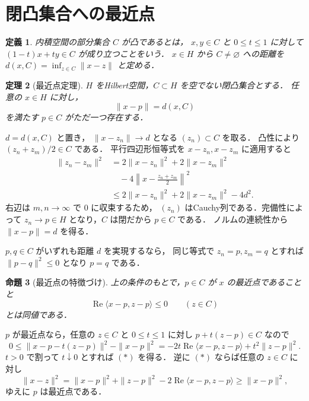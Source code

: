\documentclass[a5paper,10pt,onecolumn]{jsarticle}
\makeatletter
\theoremstyle{mathnotetheorem}
\newtheorem{theorem}{定理}[section]
\newtheorem{definition}[theorem]{定義}
\newtheorem{proposition}[theorem]{命題}
\renewcommand{\proofname}{証明}
\renewenvironment{proof}[1][\proofname]{%
  \par\pushQED{\qed}\normalfont\topsep4\p@\@plus2\p@\relax
  \trivlist\item[\hskip\labelsep\bfseries #1]\ignorespaces
}{\popQED\endtrivlist\@endpefalse}
\makeatother
\begin{document}
\section{閉凸集合への最近点}

\begin{definition}
内積空間の部分集合 $C$ が凸であるとは，
$x,y\in C$ と $0\le t\le1$ に対して
$(1-t)x+ty\in C$ が成り立つことをいう．
$x\in H$ から $C\ne\varnothing$ への距離を
$d(x,C)=\inf_{z\in C}\|x-z\|$ と定める．
\end{definition}

\begin{theorem}[最近点定理]\label{thm:nearest}
$H$ をHilbert空間，$C\subset H$ を空でない閉凸集合とする．
任意の $x\in H$ に対し，
\[
 \|x-p\|=d(x,C)
\]
を満たす $p\in C$ がただ一つ存在する．
\end{theorem}
\begin{proof}
$d=d(x,C)$ と置き，
$\|x-z_n\|\to d$ となる $(z_n)\subset C$ を取る．
凸性により $(z_n+z_m)/2\in C$ である．
平行四辺形恒等式を $x-z_n,x-z_m$ に適用すると
\begin{align*}
 \|z_n-z_m\|^2
 &=2\|x-z_n\|^2+2\|x-z_m\|^2\\
 &\quad-4\left\|x-\frac{z_n+z_m}{2}\right\|^2\\
 &\le 2\|x-z_n\|^2+2\|x-z_m\|^2-4d^2.
\end{align*}
右辺は $m,n\to\infty$ で $0$ に収束するため，
$(z_n)$ はCauchy列である．完備性によって
$z_n\to p\in H$ となり，$C$ は閉だから $p\in C$ である．
ノルムの連続性から $\|x-p\|=d$ を得る．

$p,q\in C$ がいずれも距離 $d$ を実現するなら，
同じ等式で $z_n=p,z_m=q$ とすれば
$\|p-q\|^2\le0$ となり $p=q$ である．
\end{proof}

\begin{proposition}[最近点の特徴づけ]\label{prop:variational}
上の条件のもとで，$p\in C$ が $x$ の最近点であることと
\[
 \operatorname{Re}\langle x-p,z-p\rangle\le0
 \qquad(z\in C)                                     \tag{$*$}
\]
とは同値である．
\end{proposition}
\begin{proof}
$p$ が最近点なら，任意の $z\in C$ と $0\le t\le1$ に対し
$p+t(z-p)\in C$ なので
\[
0\le\|x-p-t(z-p)\|^2-\|x-p\|^2
=-2t\operatorname{Re}\langle x-p,z-p\rangle
  +t^2\|z-p\|^2.
\]
$t>0$ で割って $t\downarrow0$ とすれば $(*)$ を得る．
逆に $(*)$ ならば任意の $z\in C$ に対し
\[
 \|x-z\|^2
 =\|x-p\|^2+\|z-p\|^2
 -2\operatorname{Re}\langle x-p,z-p\rangle
 \ge\|x-p\|^2,
\]
ゆえに $p$ は最近点である．
\end{proof}
\end{document}
